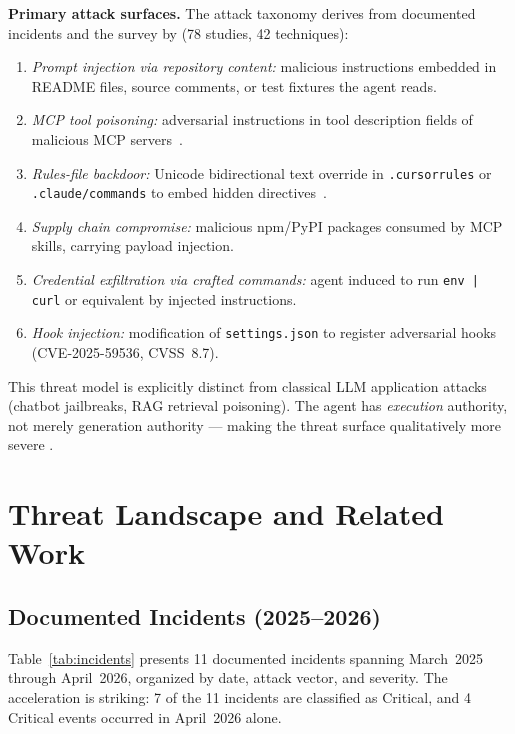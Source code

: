 \documentclass[11pt,letterpaper]{article}
\begin{document}
\textbf{Primary attack surfaces.} The attack taxonomy derives from documented incidents
and the survey by \citet{maloyan2026prompt} (78 studies, 42 techniques):
\begin{enumerate}[noitemsep,topsep=2pt]
  \item \emph{Prompt injection via repository content:} malicious instructions embedded
        in README files, source comments, or test fixtures the agent reads.
  \item \emph{MCP tool poisoning:} adversarial instructions in tool description fields
        of malicious MCP servers~\citep{labs2025mcpscan}.
  \item \emph{Rules-file backdoor:} Unicode bidirectional text override in
        \texttt{.cursorrules} or \texttt{.claude/commands} to embed hidden
        directives~\citep{security2025rules}.
  \item \emph{Supply chain compromise:} malicious npm/PyPI packages consumed by MCP
        skills, carrying payload injection.
  \item \emph{Credential exfiltration via crafted commands:} agent induced to run
        \texttt{env | curl} or equivalent by injected instructions.
  \item \emph{Hook injection:} modification of \texttt{settings.json} to register
        adversarial hooks (CVE-2025-59536, CVSS~8.7).
\end{enumerate}

This threat model is explicitly distinct from classical LLM application attacks (chatbot
jailbreaks, RAG retrieval poisoning). The agent has \emph{execution} authority, not
merely generation authority --- making the threat surface qualitatively more severe
\citep{kim2026attack,research2026architecting}.

\section{Threat Landscape and Related Work}

\subsection{Documented Incidents (2025--2026)}

Table~\ref{tab:incidents} presents 11 documented incidents spanning March~2025 through
April~2026, organized by date, attack vector, and severity. The acceleration is
striking: 7 of the 11 incidents are classified as Critical, and 4 Critical events
occurred in April~2026 alone.
\end{document}

